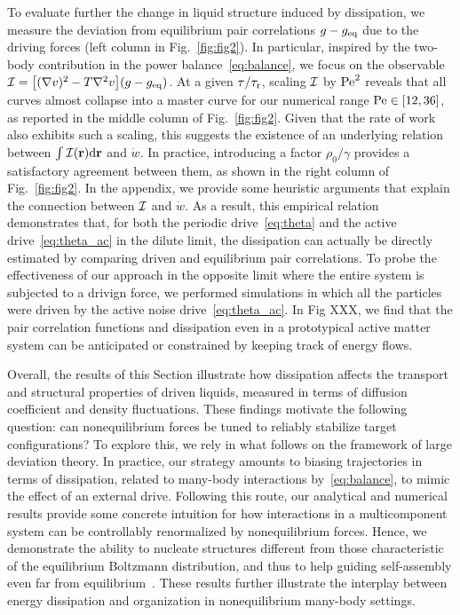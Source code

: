 \documentclass[superscriptaddress, twocolumn, prx, longbibliography, nofootinbib]{revtex4-1}
\begin{document}
To evaluate further the change in liquid structure induced by dissipation, we measure the deviation from equilibrium pair correlations $g-g_{\rm eq}$ due to the driving forces (left column in Fig.~\ref{fig:fig2}). In particular, inspired by the two-body contribution in the power balance~\eqref{eq:balance}, we focus on the observable ${\cal I} = \big[(\nabla v)^2-T\nabla^2v\big](g - g_{\rm eq})$.  At a given $\tau/\tau_{\rm r}$, scaling ${\cal I}$ by ${\rm Pe}^2$ reveals that all curves almost collapse into a master curve for our numerical range ${\rm Pe}\in[12,36]$, as reported in the middle column of Fig.~\ref{fig:fig2}. Given that the rate of work also exhibits such a scaling, this suggests the existence of an underlying relation between $\int{\cal I}({\bf r}){\rm d}{\bf r}$ and $\dot w$. In practice, introducing a factor $\rho_0/\gamma$ provides a satisfactory agreement between them, as shown in the right column of Fig.~\ref{fig:fig2}. In the appendix, we provide some heuristic arguments that explain the connection between ${\cal I}$ and $\dot{w}$. As a result, this empirical relation demonstrates that, for both the periodic drive~\eqref{eq:theta} and the active drive~\eqref{eq:theta_ac} in the dilute limit, the dissipation can actually be directly estimated by comparing driven and equilibrium pair correlations. To probe the effectiveness of our approach in the opposite limit where the entire system is subjected to a drivign force, we performed simulations in which all the particles were driven by the active noise drive~\eqref{eq:theta_ac}. In Fig XXX, we find that the pair correlation functions and dissipation even in a prototypical active matter system can be anticipated or constrained by keeping track of energy flows. 


Overall, the results of this Section illustrate how dissipation affects the transport and structural properties of driven liquids, measured in terms of diffusion coefficient and density fluctuations. These findings motivate the following question: can nonequilibrium forces be tuned to reliably stabilize target configurations? To explore this, we rely in what follows on the framework of large deviation theory. In practice, our strategy amounts to biasing trajectories in terms of dissipation, related to many-body interactions by~\eqref{eq:balance}, to mimic the effect of an external drive. Following this route, our analytical and numerical results provide some concrete intuition for how interactions in a multicomponent system can be controllably renormalized by nonequilibrium forces. Hence, we demonstrate the ability to nucleate structures different from those characteristic of the equilibrium Boltzmann distribution, and thus to help guiding self-assembly even far from equilibrium{~\cite{Bisker2018}}. These results further illustrate the interplay between energy {dissipation} and organization in nonequilibrium many-body settings.
\end{document}

